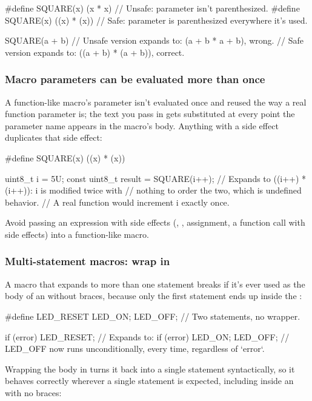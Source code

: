 \begin{ccode}
#define SQUARE(x) (x * x)     // Unsafe: parameter isn't parenthesized.
#define SQUARE(x) ((x) * (x)) // Safe: parameter is parenthesized everywhere it's used.

SQUARE(a + b)
// Unsafe version expands to: (a + b * a + b), wrong.
// Safe version expands to:   ((a + b) * (a + b)), correct.
\end{ccode}

\subsubsection{Macro parameters can be evaluated more than once}
A function-like macro's parameter isn't evaluated once and reused the way a real function parameter
is; the text you pass in gets substituted at every point the parameter name appears in the macro's
body. Anything with a side effect duplicates that side effect:

\begin{ccode}
#define SQUARE(x) ((x) * (x))

uint8_t i = 5U;
const uint8_t result = SQUARE(i++);   // Expands to ((i++) * (i++)): i is modified twice with
                                       // nothing to order the two, which is undefined behavior.
                                       // A real function would increment i exactly once.
\end{ccode}

\noindent Avoid passing an expression with side effects (\code{++}, \code{--}, assignment, a
function call with side effects) into a function-like macro.

\subsubsection{Multi-statement macros: wrap in }
A macro that expands to more than one statement breaks if it's ever used as the body of an
 without braces, because only the first statement ends up inside the :

\begin{ccode}
#define LED_RESET LED_ON; LED_OFF;   // Two statements, no wrapper.

if (error) LED_RESET;   // Expands to: if (error) LED_ON; LED_OFF;
                        // LED_OFF now runs unconditionally, every time, regardless of `error`.
\end{ccode}

\noindent Wrapping the body in  turns it back into a single statement
syntactically, so it behaves correctly wherever a single statement is expected, including inside
an  with no braces:

